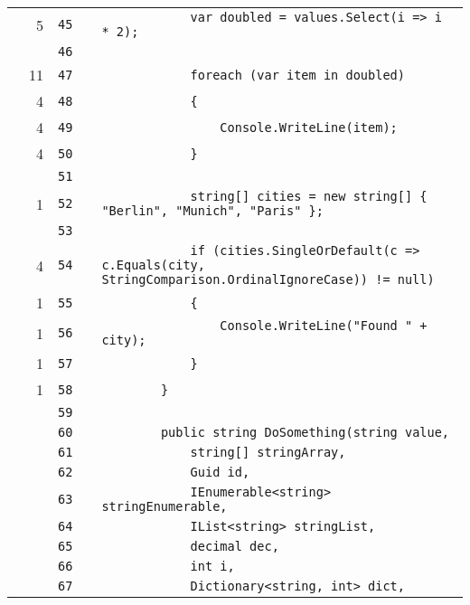 \documentclass[a4paper,landscape,10pt]{article}
\begin{document}
\begin{longtable}[l]{lrrll}
\cellcolor{green} & 5 & \verb~45~ & & \verb~            var doubled = values.Select(i => i * 2);~\\
\cellcolor{gray} &  & \verb~46~ & & \verb~~\\
\cellcolor{green} & 11 & \verb~47~ & & \verb~            foreach (var item in doubled)~\\
\cellcolor{green} & 4 & \verb~48~ & & \verb~            {~\\
\cellcolor{green} & 4 & \verb~49~ & & \verb~                Console.WriteLine(item);~\\
\cellcolor{green} & 4 & \verb~50~ & & \verb~            }~\\
\cellcolor{gray} &  & \verb~51~ & & \verb~~\\
\cellcolor{green} & 1 & \verb~52~ & & \verb~            string[] cities = new string[] { "Berlin", "Munich", "Paris" };~\\
\cellcolor{gray} &  & \verb~53~ & & \verb~~\\
\cellcolor{orange} & 4 & \verb~54~ & & \verb~            if (cities.SingleOrDefault(c => c.Equals(city, StringComparison.OrdinalIgnoreCase)) != null)~\\
\cellcolor{green} & 1 & \verb~55~ & & \verb~            {~\\
\cellcolor{green} & 1 & \verb~56~ & & \verb~                Console.WriteLine("Found " + city);~\\
\cellcolor{green} & 1 & \verb~57~ & & \verb~            }~\\
\cellcolor{green} & 1 & \verb~58~ & & \verb~        }~\\
\cellcolor{gray} &  & \verb~59~ & & \verb~~\\
\cellcolor{gray} &  & \verb~60~ & & \verb~        public string DoSomething(string value,~\\
\cellcolor{gray} &  & \verb~61~ & & \verb~            string[] stringArray,~\\
\cellcolor{gray} &  & \verb~62~ & & \verb~            Guid id,~\\
\cellcolor{gray} &  & \verb~63~ & & \verb~            IEnumerable<string> stringEnumerable,~\\
\cellcolor{gray} &  & \verb~64~ & & \verb~            IList<string> stringList,~\\
\cellcolor{gray} &  & \verb~65~ & & \verb~            decimal dec,~\\
\cellcolor{gray} &  & \verb~66~ & & \verb~            int i,~\\
\cellcolor{gray} &  & \verb~67~ & & \verb~            Dictionary<string, int> dict,~\\

\end{longtable}
\end{document}
